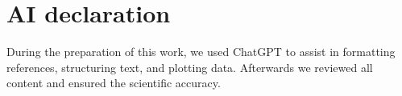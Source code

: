 \section{AI declaration}

During the preparation of this work, we used ChatGPT to assist in formatting references, structuring text, and plotting data. Afterwards we reviewed all content and ensured the scientific accuracy.
